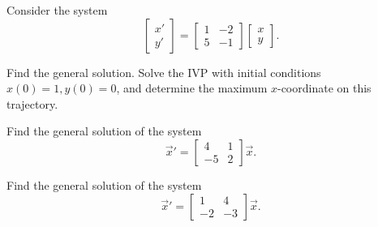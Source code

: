\begin{exercise}
Consider the system
\begin{equation*}
\begin{bmatrix} x' \\ y' \end{bmatrix} = \begin{bmatrix} 1& -2 \\ 5 & -1 \end{bmatrix} \begin{bmatrix} x \\ y \end{bmatrix}.
\end{equation*} %
\begin{tasks}
\task Find the general solution.
\task Solve the IVP with initial conditions $x(0)=1, y(0)=0$, and determine the maximum $x$-coordinate on this trajectory.
\end{tasks}
\end{exercise}

\begin{exercise}%
Find the general solution of the system
\begin{equation*}
{\vec{x}}' = \begin{bmatrix} 4 & 1 \\ -5 & 2 \end{bmatrix} \vec{x}.
\end{equation*}
\end{exercise}

\begin{exercise}%
Find the general solution of the system
\begin{equation*}
{\vec{x}}' = \begin{bmatrix} 1 & 4 \\ -2 & -3 \end{bmatrix} \vec{x}.
\end{equation*}
\end{exercise}


